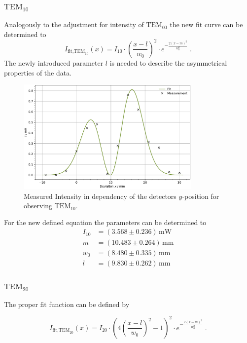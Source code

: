\subsubsection{$\text{TEM}_{10}$}

Analogously to the adjustment for intensity of $\text{TEM}_00$ the new fit curve can be determined to 
\begin{equation*}
    I_{\text{fit,TEM}_{10}}(x) = I_{10} \cdot \left( \frac{x - l}{w_0} \right)^2 \cdot e^{-\frac{2(x - m)^2}{w_0^2}}\; .
\end{equation*}
The newly introduced parameter $l$ is needed to describe the asymmetrical properties of the data.
\begin{figure}
	\centering
	\includegraphics[width=0.8\textwidth]{content/plots/TEM01.pdf}
	\caption{Measured Intensity in dependency of the detectors $y$-position for observing $\text{TEM}_{10}$.}
	\label{fig:TEM01}
\end{figure}
For the new defined equation the parameters can be determined to 
\begin{align*}
I_{10} &= \left( 3.568 \pm 0.236 \right) \, \text{mW} \\
m &= \left( 10.483 \pm 0.264 \right) \, \text{mm} \\
w_0 &= \left( 8.480 \pm 0.335 \right) \, \text{mm} \\
l &= \left( 9.830 \pm 0.262 \right) \, \text{mm}
\end{align*}

\subsubsection{$\text{TEM}_{20}$}
The proper fit function can be defined by 

\begin{equation*}
    I_{\text{fit,TEM}_{20}}(x)  = I_{20} \cdot \left( 4 \left( \frac{x - l}{w_0} \right)^2 - 1 \right)^2 \cdot e^{-\frac{2(x - m)^2}{w_0^2}}\; .
\end{equation*}

